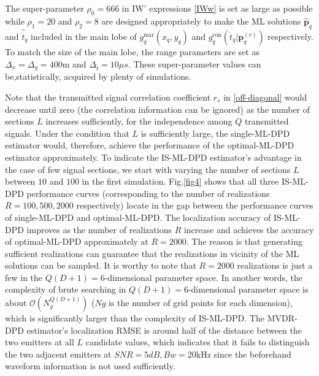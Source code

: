 \documentclass[review]{elsarticle}
\begin{document}
The super-parameter $\rho_0=666$ in IW' expressions \eqref{IWw} is set as large as possible while $\rho_1=20$ and $\rho_2=8$ are designed appropriately to make the ML solutions $\hat{\boldsymbol{p}}_q$ and $\hat{\mathring{t}}_q$ included in the main lobe of $g_{q}^{\text{mar}}(x_q,y_q)$ and $g_{q}^{\text{con}}(\mathring{t}_q\vert \boldsymbol{p}_q^{(r)})$ respectively. To match the size of the main lobe, the range parameters are set as $\Delta_x=\Delta_y=400$m and $\Delta_{\mathring{t}}=10\mu s$. These super-parameter values can be,statistically, acquired by plenty of simulations.

Note that the transmitted signal correlation coefficient $r_s$ in \eqref{off-diagonal} would decrease until zero (the correlation information can be ignored) as the number of sections $L$ increases sufficiently, for the independence among $Q$ transmitted signals. Under the condition that $L$ is sufficiently large, the single-ML-DPD estimator would, therefore, achieve the performance of the optimal-ML-DPD estimator approximately. To indicate the IS-ML-DPD estimator's advantage in the case of few signal sections, we start with varying the number of sections $L$ between $10$ and $100$ in the first simulation. Fig.\ref{fig4} shows that all three IS-ML-DPD performance curves (corresponding to the number of realizations $R=100,500,2000$ respectively) locate in the gap between the performance curves of single-ML-DPD and optimal-ML-DPD. The localization accuracy of IS-ML-DPD improves as the number of realizations $R$ increase and achieves the accuracy of optimal-ML-DPD approximately at $R=2000$. The reason is that generating sufficient realizations can guarantee that the realizations in vicinity of the ML solutions can be sampled. It is worthy to note that $R=2000$ realizations is just a few in the $Q(D+1)=6$-dimensional parameter space. In another words, the complexity of brute searching in $Q(D+1)=6$-dimensional parameter space is about $\mathcal{O}(N_g^{Q(D+1)})$ ($Ng$ is the number of grid points for each dimension), which is significantly larger than the complexity of IS-ML-DPD. The MVDR-DPD estimator's localization RMSE is around half of the distance between the two emitters at all $L$ candidate values, which indicates that it fails to distinguish the two adjacent emitters at $SNR=5dB,Bw=20$kHz since the beforehand waveform information is not used sufficiently.
\end{document}
